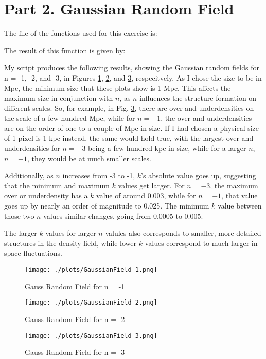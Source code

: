 \section{Part 2. Gaussian Random Field}

The file of the functions used for this exercise is:



The result of this function is given by:

My script produces the following results, showing the Gaussian random fields for n = -1, -2, and -3, in Figures \ref{fig:gauss1}, \ref{fig:gauss2}, and \ref{fig:gauss3}, respecitvely.
As I chose the size to be in Mpc, the minimum size that these plots show is 1 Mpc. This affects the
maximum size in conjunction with $n$, as $n$ influences the structure formation on different scales. So, for example,
in Fig. \ref{fig:gauss3}, there are over and underdensities on the scale of a few hundred Mpc, while for
$n = -1$, the over and underdensities are on the order of one to a couple of Mpc in size. If I had chosen a physical size
of 1 pixel is 1 kpc instead, the same would hold true, with the largest over and underdensities for $n = -3$ being a few hundred kpc
in size, while for a larger $n$, $n = -1$, they would be at much smaller scales.

Additionally, as $n$ increases from -3 to -1, $k$'s absolute value goes up, suggesting that the minimum and maximum $k$
values get larger. For $n = -3$, the maximum over or underdensity has a $k$ value of around 0.003, while for $n = -1$, that value
goes up by nearly an order of magnitude to 0.025. The minimum $k$ value between those two $n$ values similar changes, going from 0.0005
to 0.005.

The larger $k$ values for larger $n$ valules also corresponds to smaller, more detailed structures in the density field, while
lower $k$ values correspond to much larger in space fluctuations.


\begin{figure}[h!]
  \centering
  \texttt{[image: ./plots/GaussianField-1.png]}
  \caption{Gauss Random Field for n = -1}
  \label{fig:gauss1}
\end{figure}

\begin{figure}[h!]
  \centering
  \texttt{[image: ./plots/GaussianField-2.png]}
  \caption{Gauss Random Field for n = -2}
  \label{fig:gauss2}
\end{figure}

\begin{figure}[h!]
  \centering
  \texttt{[image: ./plots/GaussianField-3.png]}
  \caption{Gauss Random Field for n = -3}
  \label{fig:gauss3}
\end{figure}

